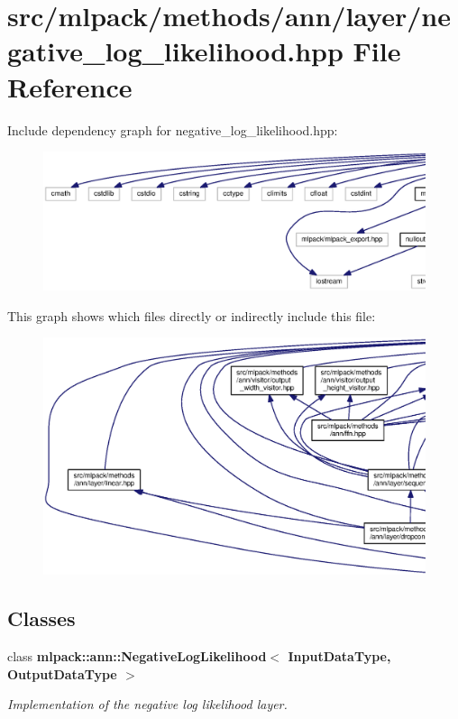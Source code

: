 \section{src/mlpack/methods/ann/layer/negative\+\_\+log\+\_\+likelihood.hpp File Reference}
\label{negative__log__likelihood_8hpp}
Include dependency graph for negative\+\_\+log\+\_\+likelihood.\+hpp\+:
\nopagebreak
\begin{figure}[H]
\begin{center}
\leavevmode
\includegraphics[width=350pt]{negative__log__likelihood_8hpp__incl}
\end{center}
\end{figure}
This graph shows which files directly or indirectly include this file\+:
\nopagebreak
\begin{figure}[H]
\begin{center}
\leavevmode
\includegraphics[width=350pt]{negative__log__likelihood_8hpp__dep__incl}
\end{center}
\end{figure}
\subsection*{Classes}
\begin{DoxyCompactItemize}
\item 
class {\bf mlpack\+::ann\+::\+Negative\+Log\+Likelihood$<$ Input\+Data\+Type, Output\+Data\+Type $>$}
\begin{DoxyCompactList}\small\item\em Implementation of the negative log likelihood layer. \end{DoxyCompactList}\end{DoxyCompactItemize}
